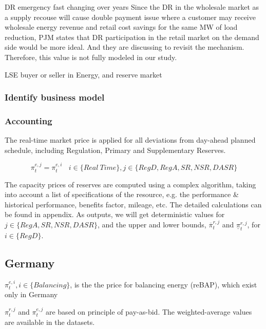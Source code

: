 DR emergency fast changing over years \cite{Brown2015}
Since the DR in the wholesale market as a supply recouse will cause double payment issue where a customer may receive wholesale energy revenue and retail cost savings for the same MW of load reduction, PJM states that DR participation in the retail market on the demand side would be more ideal. And they are discussing to revisit the mechanism. Therefore, this value is not fully modeled in our study.

LSE
buyer or seller in Energy, and reserve market

\subsubsection{Identify business model}

\subsubsection{Accounting}





The real-time market price is applied for all deviations from day-ahead planned schedule, including Regulation, Primary and Supplementary Reserves.

\begin{equation*}
\pi_t^{e,j} = \pi_t^{e,i} ~~~~ i \in \{Real~Time\}, j \in \{RegD, RegA, SR, NSR, DASR\}
\end{equation*}

The capacity prices of reserves are computed using a complex algorithm, taking into account a list of specifications of the resource, e.g. the performance \& historical performance, benefits factor, mileage, etc. The detailed calculations can be found in appendix. As outputs, we will get deterministic values for $j \in \{RegA, SR, NSR, DASR\}$, and the upper and lower bounds, $\overline{\pi}_t^{r,j}$ and $\underline{\pi}_t^{r,j}$, for $i \in \{RegD\}$.


\subsection{Germany}
$\pi_t^{e,i}, i \in \{Balancing\}$, is the the price for balancing energy (reBAP), which exist only in Germany

$\pi_t^{r,j}$ and $\pi_t^{e,j}$ are based on principle of pay-as-bid. The weighted-average values are available in the datasets.

